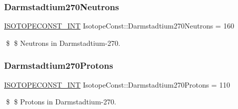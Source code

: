\subsubsection{\texorpdfstring{Darmstadtium270\+Neutrons}{Darmstadtium270Neutrons}}
{\footnotesize\ttfamily \mbox{\hyperlink{group___isotope_const-_macros_ga5f18360b3e99483a35c32d789e62621c}{I\+S\+O\+T\+O\+P\+E\+C\+O\+N\+S\+T\+\_\+\+I\+NT}} Isotope\+Const\+::\+Darmstadtium270\+Neutrons = 160}

\$ \$ Neutrons in Darmstadtium-\/270. \mbox{\label{group___isotope_const-_darmstadtium-_ds270_ga899ed60f5cc8017885c1816317bec3c3}} 
\subsubsection{\texorpdfstring{Darmstadtium270\+Protons}{Darmstadtium270Protons}}
{\footnotesize\ttfamily \mbox{\hyperlink{group___isotope_const-_macros_ga5f18360b3e99483a35c32d789e62621c}{I\+S\+O\+T\+O\+P\+E\+C\+O\+N\+S\+T\+\_\+\+I\+NT}} Isotope\+Const\+::\+Darmstadtium270\+Protons = 110}

\$ \$ Protons in Darmstadtium-\/270. 